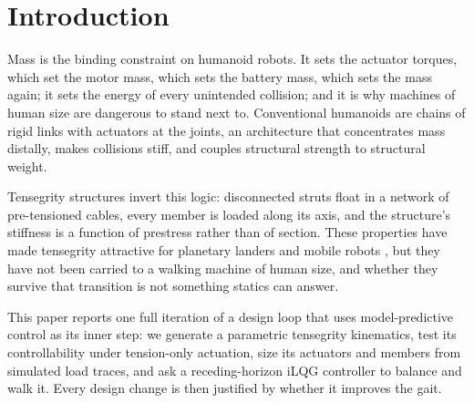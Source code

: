 \documentclass[conference]{IEEEtran}
\begin{document}
\section{Introduction}
Mass is the binding constraint on humanoid robots. It sets the actuator
torques, which set the motor mass, which sets the battery mass, which sets the
mass again; it sets the energy of every unintended collision; and it is why
machines of human size are dangerous to stand next to. Conventional humanoids
are chains of rigid links with actuators at the joints, an architecture that
concentrates mass distally, makes collisions stiff, and couples structural
strength to structural weight.

Tensegrity structures \cite{fuller1962patent,snelson1965patent} invert this
logic: disconnected struts float in a network of pre-tensioned cables, every
member is loaded along its axis, and the structure's stiffness is a function
of prestress rather than of section. These properties have made tensegrity
attractive for planetary landers and mobile robots
\cite{sabelhaus2015superball,caluwaerts2014design,paul2006locomotion,shah2022tensegrity},
but they have not been carried to a walking machine of human size, and
whether they survive that transition is not something statics can answer.

This paper reports one full iteration of a design loop that uses
model-predictive control as its inner step: we generate a parametric
tensegrity kinematics, test its controllability under tension-only actuation,
size its actuators and members from simulated load traces, and ask a
receding-horizon iLQG controller \cite{li2004ilqr,tassa2012synthesis,
howell2022mjpc} to balance and walk it. Every design change is then justified
by whether it improves the gait.
\end{document}
